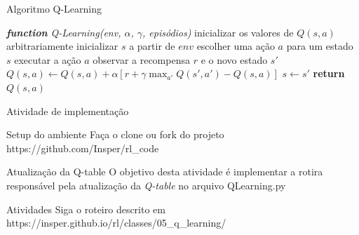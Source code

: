 \documentclass{beamer}
\begin{document}
\begin{frame}{Algoritmo Q-Learning} 
	\begin{algorithmic} 
		\STATE \emph{\textbf{function} Q-Learning(env, $\alpha$, $\gamma$, episódios)}
		\STATE inicializar os valores de $Q(s, a)$ arbitrariamente
		\STATE inicializar $s$ a partir de $env$
		\REPEAT
		\STATE escolher uma ação $a$ para um estado $s$
		\STATE executar a ação $a$
		\STATE observar a recompensa $r$ e o novo estado $s'$ 
		\STATE $Q(s,a) \leftarrow Q(s,a) + \alpha [r +\gamma \max_{a'}{Q(s', a')} - Q(s,a)]$
		\STATE$s  \leftarrow s'$
		\ENDFOR
		\STATE \textbf{return} $Q(s, a)$
	\end{algorithmic}
\end{frame}


\begin{frame}{Atividade de implementação}
	
	\begin{block}{Setup do ambiente}
		Faça o clone ou fork do projeto https://github.com/Insper/rl\_code
		\href{https://github.com/Insper/rl_code}{\beamergotobutton{Link}}
	\end{block}
	
	\begin{alertblock}{Atualização da Q-table}
		O objetivo desta atividade é implementar a rotira responsável pela atualização da \textit{Q-table} no arquivo QLearning.py
	\end{alertblock}
	
	\begin{block}{Atividades}
		Siga o roteiro descrito em https://insper.github.io/rl/classes/05\_q\_learning/ \href{https://insper.github.io/rl/classes/05_q_learning/}
		{\beamergotobutton{Link}}
	\end{block}

\end{frame}

%
%
\end{document}
